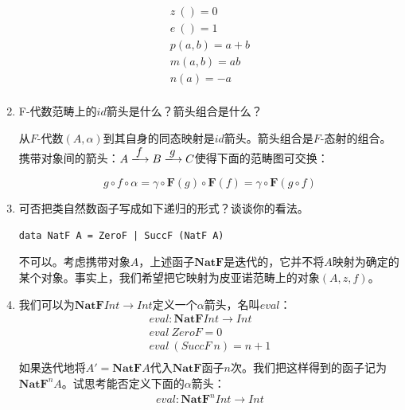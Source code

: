 \documentclass[UTF8]{article}
\begin{document}
\begin{enumerate}
\[\begin{array}{l}
z\ () = 0 \\
e\ () = 1 \\
p(a, b) = a + b \\
m(a, b) = ab \\
n(a) = -a \\
\end{array}\]

\item{F-代数范畴上的$id$箭头是什么？箭头组合是什么？}

从$F$-代数$(A, \alpha)$到其自身的同态映射是$id$箭头。箭头组合是$F$-态射的组合。携带对象间的箭头：$A \arrowto{f} B \arrowto{g} C$使得下面的范畴图可交换：

\begin{center}
\end{center}

\[
  g \circ f \circ \alpha = \gamma \circ \mathbf{F}(g) \circ \mathbf{F}(f) = \gamma \circ \mathbf{F}(g \circ f)
\]

\item{可否把类自然数函子写成如下递归的形式？谈谈你的看法。
\begin{lstlisting}
data NatF A = ZeroF | SuccF (NatF A)
\end{lstlisting}
}

不可以。考虑携带对象$A$，上述函子$\mathbf{NatF}$是迭代的，它并不将$A$映射为确定的某个对象。事实上，我们希望把它映射为皮亚诺范畴上的对象$(A, z, f)$。

\item{我们可以为$\mathbf{NatF} Int \to Int$定义一个$\alpha$箭头，名叫$eval$：
\[
\begin{array}{l}
eval : \mathbf{NatF} Int \to Int \\
eval\ ZeroF = 0 \\
eval\ (SuccF\ n) = n + 1 \\
\end{array}
\]
如果迭代地将$A' = \mathbf{NatF} A$代入$\mathbf{NatF}$函子$n$次。我们把这样得到的函子记为$\mathbf{NatF}^n A$。试思考能否定义下面的$\alpha$箭头：
\[
\begin{array}{l}
eval : \mathbf{NatF}^n Int \to Int \\
\end{array}
\]
}


\end{enumerate}
\end{document}
